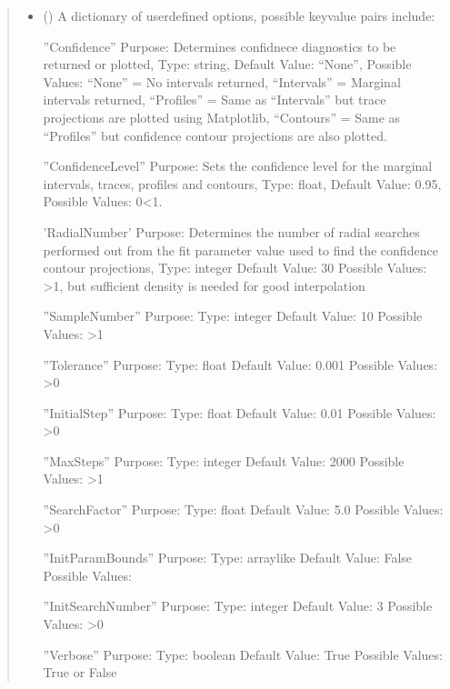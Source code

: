 \documentclass[letterpaper,10pt,english,openany,oneside]{sphinxmanual}
\begin{document}
\begin{fulllineitems}
\begin{fulllineitems}
\begin{quote}
\begin{description}
\begin{itemize}
\item {} 
 (\sphinxstyleliteralemphasis{\sphinxupquote{, }}) \textendash{} 
A dictionary of user\sphinxhyphen{}defined options, possible key\sphinxhyphen{}value pairs
include:

”Confidence” \textendash{}
Purpose: Determines confidnece diagnostics to be returned or plotted,
Type: string,
Default Value: “None”,
Possible Values:
“None” = No intervals returned,
“Intervals” = Marginal intervals returned,
“Profiles” = Same as “Intervals” but trace projections are plotted using Matplotlib,
“Contours” = Same as  “Profiles” but confidence contour projections are also plotted.

”ConfidenceLevel” \textendash{}
Purpose: Sets the confidence level for the marginal intervals, traces, profiles and contours,
Type: float,
Default Value: 0.95,
Possible Values: 0\textless{}1.

’RadialNumber’ \textendash{}
Purpose: Determines the number of radial searches performed out from the fit
parameter value used to find the confidence contour projections,
Type: integer
Default Value: 30
Possible Values: \textgreater{}1, but sufficient density is needed for good interpolation

”SampleNumber” \textendash{}
Purpose:
Type: integer
Default Value: 10
Possible Values: \textgreater{}1

”Tolerance” \textendash{}
Purpose:
Type: float
Default Value: 0.001
Possible Values: \textgreater{}0

”InitialStep” \textendash{}
Purpose:
Type: float
Default Value: 0.01
Possible Values: \textgreater{}0

”MaxSteps” \textendash{}
Purpose:
Type: integer
Default Value: 2000
Possible Values: \textgreater{}1

”SearchFactor” \textendash{}
Purpose:
Type: float
Default Value: 5.0
Possible Values: \textgreater{}0

”InitParamBounds” \textendash{}
Purpose:
Type: array\sphinxhyphen{}like
Default Value: False
Possible Values:

”InitSearchNumber” \textendash{}
Purpose:
Type: integer
Default Value: 3
Possible Values: \textgreater{}0

”Verbose” \textendash{}
Purpose:
Type: boolean
Default Value: True
Possible Values: True or False


\end{itemize}


\end{description}
\end{quote}
\end{fulllineitems}
\end{fulllineitems}
\end{document}
